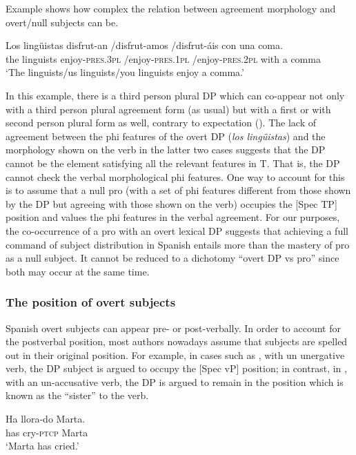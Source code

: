 \documentclass[output=paper]{langscibook}
\begin{document}
Example  shows how complex the relation between agreement morphology and overt/null subjects can be.

\ea  \label{ex:dominguez:2}
\gll Los lingüistas disfrut-an      /disfrut-amos    /disfrut-áis         con una coma.\\
  the linguists   enjoy-\textsc{pres.3pl} /enjoy-\textsc{pres.1pl} /enjoy-\textsc{pres.2pl}  with a comma\\
\glt   ‘The linguists/us linguists/you linguists enjoy a comma.’
\z

In this example, there is a third person plural DP which can co-appear not only with a third person plural agreement form (as usual) but with a first or with second person plural form as well, contrary to expectation (\citealt{TorregoLaka2015,Villa-Garcia2018}). The lack of agreement between the phi features of the overt DP (\textit{los lingüistas}) and the morphology shown on the verb in the latter two cases suggests that the DP cannot be the element satisfying all the relevant features in T. That is, the DP cannot check the verbal morphological phi features. One way to account for this is to assume that a null pro (with a set of phi features different from those shown by the DP but agreeing with those shown on the verb) occupies the [Spec TP] position and values the phi features in the verbal agreement. For our purposes, the co-occurrence of a pro with an overt lexical DP suggests that achieving a full command of subject distribution in Spanish entails more than the mastery of pro as a null subject. It cannot be reduced to a dichotomy “overt DP vs pro” since both may occur at the same time.

\subsubsection{The position of overt subjects}
Spanish overt subjects can appear pre- or post-verbally. In order to account for the postverbal position, most authors nowadays assume that subjects are spelled out in their original position. For example, in cases such as , with un unergative verb, the DP subject is argued to occupy the [Spec vP] position; in contrast, in , with an un-accusative verb, the DP is argued to remain in the position which is known as the ``sister'' to the verb.

\ea%
   \label{ex:dominguez:3}
\ea\label{ex:dominguez:3a}
\gll Ha llora-do             Marta.\\
       has cry-\textsc{ptcp}     Marta\\
\glt       ‘Marta has cried.’
\end{document}
